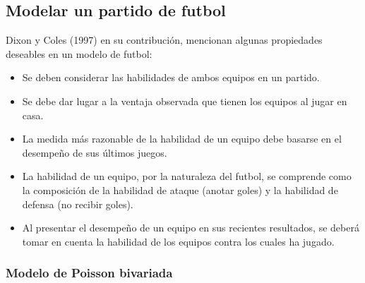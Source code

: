 \subsection{Modelar un partido de futbol}
\label{subsec:modelo}


%


Dixon y Coles (1997) \cite{dixon1997modelling} en su contribución, mencionan algunas propiedades deseables en un modelo de futbol:
\begin{itemize}
	\item Se deben considerar las habilidades de ambos equipos en un partido.
	\item Se debe dar lugar a la ventaja observada que tienen los equipos al jugar en casa.
	\item La medida más razonable de la habilidad de un equipo debe basarse en el desempeño de sus últimos juegos.
	\item La habilidad de un equipo, por la naturaleza del futbol, se comprende como la composición de la habilidad de ataque (anotar goles) y la habilidad de defensa (no recibir goles).
	\item Al presentar el desempeño de un equipo en sus recientes resultados, se deberá tomar en cuenta la habilidad de los equipos contra los cuales ha jugado.
\end{itemize}


 \subsubsection{Modelo de Poisson bivariada}
 \label{subsubsec:bivariate-poisson}

